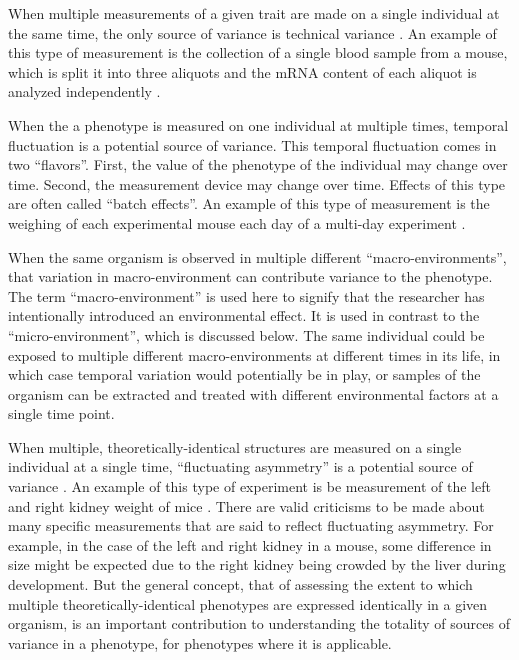 When multiple measurements of a given trait are made on a single individual at the same time, the only source of variance is technical variance \citep{Ronnegard2011a}.
An example of this type of measurement is the collection of a single blood sample from a mouse, which is split it into three aliquots and the mRNA content of each aliquot is analyzed independently \citep{Marioni2008}.

When the a phenotype is measured on one individual at multiple times, temporal fluctuation is a potential source of variance.
This temporal fluctuation comes in two ``flavors''.
First, the value of the phenotype of the individual may change over time.
Second, the measurement device may change over time.
Effects of this type are often called ``batch effects''.
An example of this type of measurement is the weighing of each experimental mouse each day of a multi-day experiment \citep{Gray2015}.

When the same organism is observed in multiple different ``macro-environments'', that variation in macro-environment can contribute variance to the phenotype.
The term ``macro-environment'' is used here to signify that the researcher has intentionally introduced an environmental effect.
It is used in contrast to the ``micro-environment'', which is discussed below.
The same individual could be exposed to multiple different macro-environments at different times in its life, in which case temporal variation would potentially be in play, or samples of the organism can be extracted and treated with different environmental factors at a single time point.

When multiple, theoretically-identical structures are measured on a single individual at a single time, ``fluctuating asymmetry'' is a potential source of variance \citep{Palmer1986}.
An example of this type of experiment is be measurement of the left and right kidney weight of mice \citep{Leamy2000,Leamy2002}.
There are valid criticisms to be made about many specific measurements that are said to reflect fluctuating asymmetry.
For example, in the case of the left and right kidney in a mouse, some difference in size might be expected due to the right kidney being crowded by the liver during development.
But the general concept, that of assessing the extent to which multiple theoretically-identical phenotypes are expressed identically in a given organism, is an important contribution to understanding the totality of sources of variance in a phenotype, for phenotypes where it is applicable.

